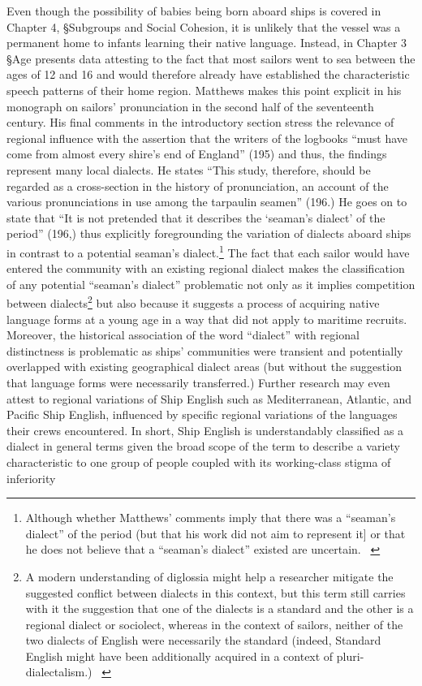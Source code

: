 \begin{styleStandard}
Even though the possibility of babies being born aboard ships is covered in Chapter 4, §Subgroups and Social Cohesion, it is unlikely that the vessel was a permanent home to infants learning their native language. Instead, in Chapter 3 §Age presents data attesting to the fact that most sailors went to sea between the ages of 12 and 16 and would therefore already have established the characteristic speech patterns of their home region. Matthews makes this point explicit in his monograph on sailors’ pronunciation in the second half of the seventeenth century. His final comments in the introductory section stress the relevance of regional influence with the assertion that the writers of the logbooks “must have come from almost every shire’s end of England” (195) and thus, the findings represent many local dialects. He states “This study, therefore, should be regarded as a cross-section in the history of pronunciation, an account of the various pronunciations in use among the tarpaulin seamen” (196.) He goes on to state that “It is not pretended that it describes the ‘seaman’s dialect’ of the period” (196,) thus explicitly foregrounding the variation of dialects aboard ships in contrast to a potential seaman’s dialect.\footnote{ Although whether Matthews’ comments imply that there was a “seaman’s dialect” of the period (but that his work did not aim to represent it] or that he does not believe that a “seaman’s dialect” existed are uncertain. \ } The fact that each sailor would have entered the community with an existing regional dialect makes the classification of any potential “seaman’s dialect” problematic not only as it implies competition between dialects\footnote{ A modern understanding of diglossia might help a researcher mitigate the suggested conflict between dialects in this context, but this term still carries with it the suggestion that one of the dialects is a standard and the other is a regional dialect or sociolect, whereas in the context of sailors, neither of the two dialects of English were necessarily the standard (indeed, Standard English might have been additionally acquired in a context of pluri-dialectalism.) \ } but also because it suggests a process of acquiring native language forms at a young age in a way that did not apply to maritime recruits. Moreover, the historical association of the word “dialect” with regional distinctness is problematic as ships’ communities were transient and potentially overlapped with existing geographical dialect areas (but without the suggestion that language forms were necessarily transferred.) Further research may even attest to regional variations of Ship English such as Mediterranean, Atlantic, and Pacific Ship English, influenced by specific regional variations of the languages their crews encountered. In short, Ship English is understandably classified as a dialect in general terms given the broad scope of the term to describe a variety characteristic to one group of people coupled with its working-class stigma of inferiority 
\end{styleStandard}
